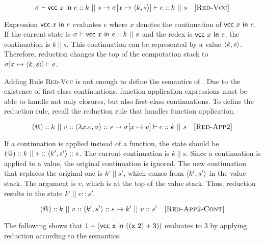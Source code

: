 \[
  \sigma\vdash\textsf{vcc}\ x\ \textsf{in}\ e::k\ ||\ s\rightarrow
  \sigma[x\mapsto\langle k,s\rangle]\vdash e::k\ ||\ s
  \quad\textsc{[Red-Vcc]}
\]

Expression $\textsf{vcc}\ x\ \textsf{in}\ e$ evaluates $e$ where $x$ denotes the
continuation of $\textsf{vcc}\ x\ \textsf{in}\ e$. If the current state is $\sigma\vdash\textsf{vcc}\ x\ \textsf{in}\ e::k\
||\ s$ and the redex is $\textsf{vcc}\ x\ \textsf{in}\ e$, the continuation is $k\ ||\ s$.
This continuation can be represented by a value $\langle k,s\rangle$. Therefore,
reduction changes the top of the
computation stack to $\sigma[x\mapsto\langle k,s\rangle]\vdash e$.

Adding Rule \textsc{Red-Vcc} is not enough to define the semantics of \lang.
Due to the existence of first-class continuations, function application
expressions must be able to handle not only closures, but also first-class
continuations. To define the reduction rule, recall the reduction rule that
handles function application.

\[
  \appk k\ ||\ \conss{v}\conss{\clov{x}{e}{\sigma}}s\rightarrow
  \evalk{\sigma\lbrack x\mapsto v\rbrack}{e}k\ ||\ s
  \quad\textsc{[Red-App2]}
\]

If a continuation is applied instead of a function,
the state should be $\appk k\ ||\ \conss{v}\conss{\contv{k'}{s'}}s$.
The current continuation is $k\ ||\ s$. Since a continuation is applied to a
value, the original continuation is ignored. The new continuation that replaces the original
one is $k'\ ||\ s'$, which comes from $\langle k',s'\rangle$ in the value stack.
The argument is $v$, which is at the top of the value stack.
Thus, reduction results in the state $k'\ ||\ v::s'$.

\[
  \appk k\ ||\ \conss{v}\conss{\contv{k'}{s'}}s\rightarrow k'\ ||\ v::s'
  \quad\textsc{[Red-App2-Cont]}
\]

The following shows that $1+(\textsf{vcc}\ \cx\ \textsf{in}\ ((\cx\ 2)+3))$
evaluates to $3$ by applying reduction according to the semantics:

